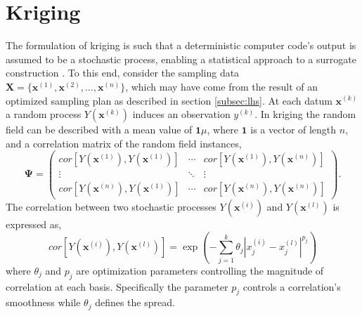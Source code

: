 \section{Kriging} \label{sec:kriging}

The formulation of kriging is such that a deterministic computer code's output is assumed to be a stochastic process, enabling a statistical approach to a surrogate construction \cite{Sacks}. To this end, consider the sampling data $\textbf{X}=\lbrace \textbf{x}^{(1)}, \textbf{x}^{(2)}, ..., \textbf{x}^{(n)}\rbrace$, which may have come from the result of an optimized sampling plan as described in section \ref{subsec:lhs}. At each datum $\textbf{x}^{(k)}$ a random process $Y(\textbf{x}^{(k)})$ induces an observation $y^{(k)}$. In kriging the random field can be described with a mean value of $\textbf{1}\mu$, where $\textbf{1}$ is a vector of length $n$, and a correlation matrix of the random field instances,
\begin{equation}
\label{eq:Psi}
 \boldsymbol{\Psi} =
 \begin{pmatrix} 
	cor[Y(\textbf{x}^{(1)}), Y(\textbf{x}^{(1)})] & \cdots & 
		cor[Y(\textbf{x}^{(1)}), Y(\textbf{x}^{(n)})] \\
	\vdots & \ddots & \vdots \\ 
	cor[Y(\textbf{x}^{(n)}), Y(\textbf{x}^{(1)})] & \cdots & 
		cor[Y(\textbf{x}^{(n)}), Y(\textbf{x}^{(n)})]
 \end{pmatrix}.
\end{equation}   
The correlation between two stochastic processes $Y(\textbf{x}^{(i)})$ and $Y(\textbf{x}^{(l)})$ is expressed as,
\begin{equation}
\label{eq:gauss_correlation}
   cor[Y(\textbf{x}^{(i)}), Y(\textbf{x}^{(l)})] = 
    \exp\left(-\sum_{j=1}^k \theta_j |x_j^{(i)} - x_j^{(l)} |^{p_j} \right) 
\end{equation}
where $\theta_j$ and $p_j$ are optimization parameters controlling the magnitude of correlation at each basis. Specifically the parameter $p_j$ controls a correlation's smoothness while $\theta_j$ defines the spread. 

